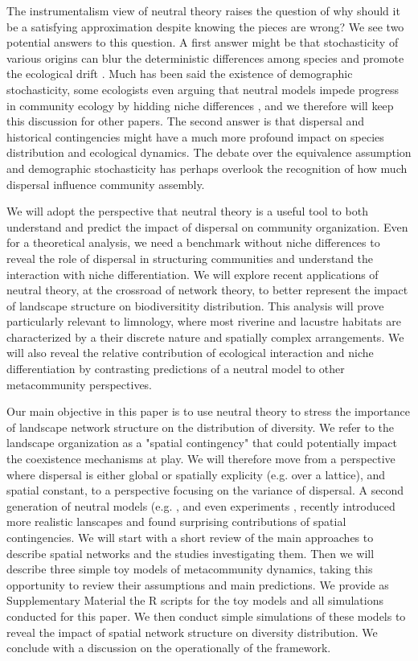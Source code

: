\documentclass[12pt]{article}
\begin{document}
The instrumentalism view of neutral theory raises the question of why should it be a satisfying approximation despite knowing the pieces are wrong? We see two potential answers to this question. A first answer might be that stochasticity of various origins can blur the deterministic differences among species and promote the ecological drift \parencite{Gravel2011}. Much has been said the existence of demographic stochasticity, some ecologists even arguing that neutral models impede progress in community ecology by hidding niche differences \parencite{Clark2012}, and we therefore will keep this discussion for other papers. The second answer is that dispersal and historical contingencies might have a much more profound impact on species distribution \parencite{Bahn2007} and ecological dynamics. The debate over the equivalence assumption and demographic stochasticity has perhaps overlook the recognition of how much dispersal influence community assembly.

We will adopt the perspective that neutral theory is a useful tool to both understand and predict the impact of dispersal on community organization. Even for a theoretical analysis, we need a benchmark without niche differences to reveal the role of dispersal in structuring communities and understand the interaction with niche differentiation. We will explore recent applications of neutral theory, at the crossroad of network theory, to better represent the impact of landscape structure on biodiversitity distribution. This analysis will prove particularly relevant to limnology, where most riverine and lacustre habitats are characterized by a their discrete nature and spatially complex arrangements. We will also reveal the relative contribution of ecological interaction and niche differentiation by contrasting predictions of a neutral model to other metacommunity perspectives. 

Our main objective in this paper is to use neutral theory to stress the importance of landscape network structure on the distribution of diversity. We refer to the landscape organization as a "spatial contingency" \parencite{Peres-Neto2013} that could potentially impact the coexistence mechanisms at play. We will therefore move from a perspective where dispersal is either global or spatially explicity (e.g. over a lattice), and spatial constant, to a perspective focusing on the variance of dispersal. A second generation of neutral models (e.g. \textcite{Economo2008, Economo2011,Desjardins2012a,Desjardins2012b}, and even experiments \parencite{Altermat2012}, recently introduced more realistic lanscapes and found surprising contributions of spatial contingencies. We will start with a short review of the main approaches to describe spatial networks and the studies investigating them. Then we will describe three simple toy models of metacommunity dynamics, taking this opportunity to review their assumptions and main predictions. We provide as Supplementary Material the R scripts for the toy models and all simulations conducted for this paper. We then conduct simple simulations of these models to reveal the impact of spatial network structure on diversity distribution. We conclude with a discussion on the operationally of the framework.
\end{document}
